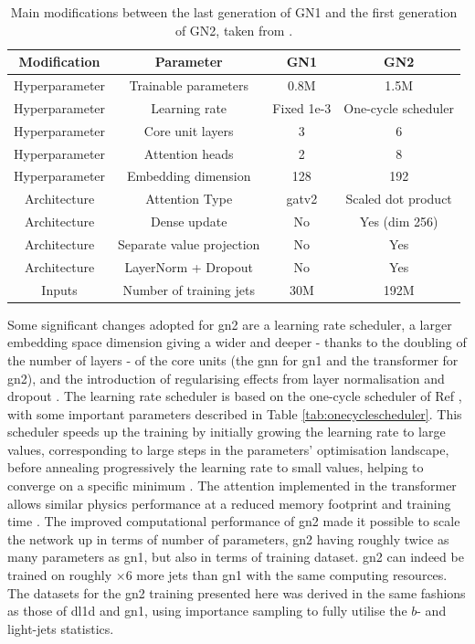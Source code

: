 \begin{table}[h]
  \begin{center}
      \begin{tabular}{c|c|c|c} 
      	 \hline \hline
          Modification & Parameter & GN1 & GN2 \\ \hline
          Hyperparameter  & Trainable parameters & 0.8M & 1.5M \\ 
          Hyperparameter  & Learning rate & Fixed 1e-3 & One-cycle scheduler\\ 
          Hyperparameter  & Core unit layers & 3 & 6 \\ 
          Hyperparameter  & Attention heads & 2 & 8 \\ 
          Hyperparameter  & Embedding dimension & 128 & 192 \\ \hline
          Architecture    & Attention Type & \gls{gat}v2 & Scaled dot product \\ 
          Architecture    & Dense update & No & Yes (dim 256) \\ 
          Architecture    & Separate value projection & No & Yes \\ 
          Architecture    & LayerNorm + Dropout & No & Yes \\ \hline
          Inputs          & Number of training jets & 30M & 192M  \\ \hline \hline
      \end{tabular}
    \caption{Main modifications between the last generation of GN1 and the first generation of GN2, taken from \cite{ATL-PLOT-FTAG-2023-01}.}
    \label{tab:gn2compGN1}
  \end{center}
\end{table}

Some significant changes adopted for \gls{gn2} are a learning rate scheduler, a larger embedding space dimension giving a wider and deeper - thanks to the doubling of the number of layers - of the core units (the \gls{gnn} for \gls{gn1} and the transformer for \gls{gn2}), and the introduction of regularising effects from layer normalisation and dropout \cite{ba2016layer}. The learning rate scheduler is based on the one-cycle scheduler of Ref \cite{smith2018disciplined}, with some important  parameters described in Table \ref{tab:onecyclescheduler}. This scheduler speeds up the training by initially growing the learning rate to large values, corresponding to large steps in the parameters' optimisation landscape, before annealing progressively the learning rate to small values, helping to converge on a specific minimum \cite{smith2018superconvergence}. The attention implemented in the transformer allows similar physics performance at a reduced memory footprint and training time \cite{duperrin2023flavour}. The improved computational performance of \gls{gn2} made it possible to scale the network up in terms of number of parameters, \gls{gn2} having roughly twice as many parameters as \gls{gn1}, but also in terms of training dataset. \gls{gn2} can indeed be trained on roughly $\times 6$ more jets than \gls{gn1} with the same computing resources. The datasets for the \gls{gn2} training presented here was derived in the same fashions as those of \gls{dl1d} and \gls{gn1}, using importance sampling to fully utilise the $b$- and light-jets statistics. 

